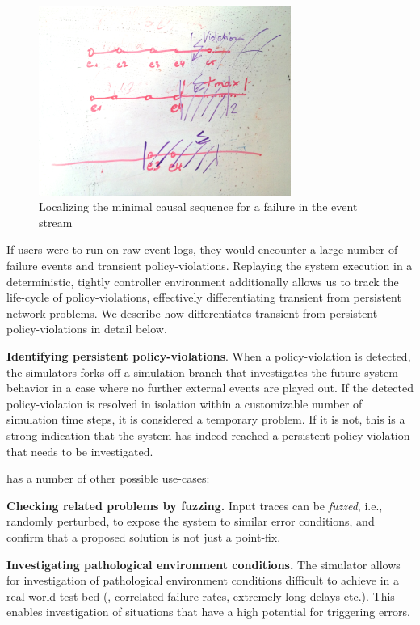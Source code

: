 \begin{figure}[t]
    \includegraphics[width=3.25in]{../diagrams/approach/localizing}
    \caption[]{\label{fig:localizing} Localizing the minimal causal sequence for a failure in the 
    event stream}
\end{figure}

If users were to run \simulator{} on raw event logs, they would encounter a
large number of failure events and transient policy-violations. 
Replaying the system execution in a deterministic,
tightly controller environment additionally allows us
to track the life-cycle of policy-violations, effectively differentiating
transient from persistent network problems.
We describe how \simulator{} differentiates transient from persistent
policy-violations in detail below.

\textbf{Identifying persistent policy-violations}. When a policy-violation is detected,
the simulators forks off a simulation branch that investigates the future system behavior
in a case where no further external events are played out. If the detected
policy-violation
is resolved in isolation within a customizable number of simulation time steps, it is considered
a temporary problem. If it is not, this is a strong indication that the system has indeed
reached a persistent policy-violation that needs to be investigated.

\Simulator{} has a number of other possible use-cases:

\textbf{Checking related problems by fuzzing.} Input traces can be \emph{fuzzed}, i.e.,
randomly perturbed, to expose the system to similar error conditions, and confirm
that a proposed solution is not just a point-fix.

\textbf{Investigating pathological environment conditions.} The simulator allows for investigation
of pathological environment conditions difficult to achieve in a real world test bed
(\eg{}, correlated failure rates, extremely long delays etc.). This enables
investigation of situations that have a high potential for triggering errors.

